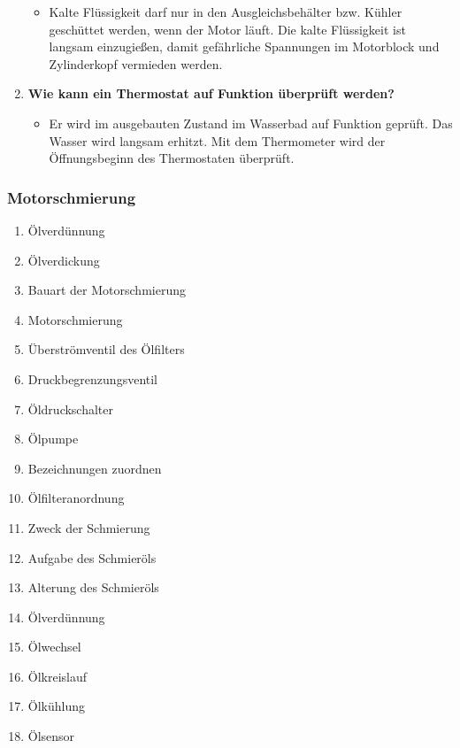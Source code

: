 \begin{enumerate}
  \begin{itemize}
  \item
    Kalte Flüssigkeit darf nur in den Ausgleichsbehälter bzw. Kühler
    geschüttet werden, wenn der Motor läuft. Die kalte Flüssigkeit ist
    langsam einzugießen, damit gefährliche Spannungen im Motorblock und
    Zylinderkopf vermieden werden.
  \end{itemize}
\item
  \textbf{Wie kann ein Thermostat auf Funktion überprüft werden?}

  \begin{itemize}
  \item
    Er wird im ausgebauten Zustand im Wasserbad auf Funktion geprüft.
    Das Wasser wird langsam erhitzt. Mit dem Thermometer wird der
    Öffnungsbeginn des Thermostaten überprüft.
  \end{itemize}
\end{enumerate}

\subsubsection{Motorschmierung}\label{motorschmierung}

\begin{enumerate}
\item
  Ölverdünnung\\
\item
  Ölverdickung\\
\item
  Bauart der Motorschmierung\\
\item
  Motorschmierung\\
\item
  Überströmventil des Ölfilters\\
\item
  Druckbegrenzungsventil\\
\item
  Öldruckschalter\\
\item
  Ölpumpe\\
\item
  Bezeichnungen zuordnen\\
\item
  Ölfilteranordnung\\
\item
  Zweck der Schmierung\\
\item
  Aufgabe des Schmieröls\\
\item
  Alterung des Schmieröls\\
\item
  Ölverdünnung\\
\item
  Ölwechsel\\
\item
  Ölkreislauf\\
\item
  Ölkühlung\\
\item
  Ölsensor
\end{enumerate}

